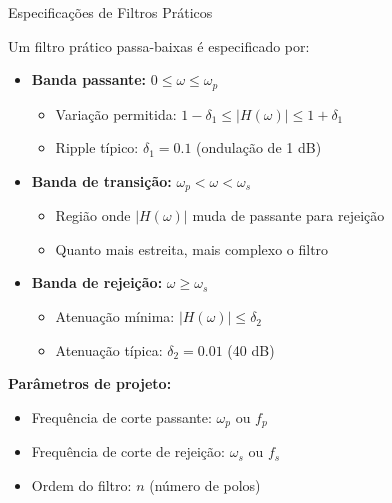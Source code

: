 \begin{frame}{Especificações de Filtros Práticos}

Um filtro prático passa-baixas é especificado por:

\begin{itemize}
\item \textbf{Banda passante:} $0 \leq \omega \leq \omega_p$
  \begin{itemize}
  \item Variação permitida: $1 - \delta_1 \leq |H(\omega)| \leq 1 + \delta_1$
  \item Ripple típico: $\delta_1 = 0.1$ (ondulação de 1 dB)
  \end{itemize}

\item \textbf{Banda de transição:} $\omega_p < \omega < \omega_s$
  \begin{itemize}
  \item Região onde $|H(\omega)|$ muda de passante para rejeição
  \item Quanto mais estreita, mais complexo o filtro
  \end{itemize}

\item \textbf{Banda de rejeição:} $\omega \geq \omega_s$
  \begin{itemize}
  \item Atenuação mínima: $|H(\omega)| \leq \delta_2$
  \item Atenuação típica: $\delta_2 = 0.01$ (40 dB)
  \end{itemize}
\end{itemize}

\vspace{0.1cm}

\textbf{Parâmetros de projeto:}
\begin{itemize}
\item Frequência de corte passante: $\omega_p$ ou $f_p$
\item Frequência de corte de rejeição: $\omega_s$ ou $f_s$
\item Ordem do filtro: $n$ (número de polos)
\end{itemize}

\end{frame}



